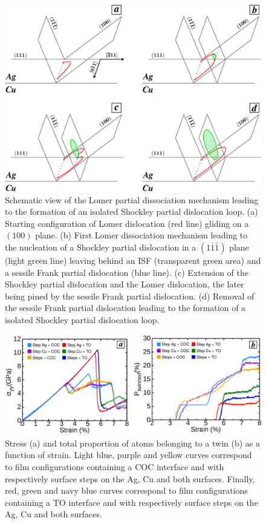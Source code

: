\documentclass[final,3p,times,twocolumn]{elsarticle}
\begin{document}
\begin{figure}[!t]
	\begin{center}
		\includegraphics[width=150mm]{Pic/fig_lomdisso.eps} 
	\end{center}
	\caption{Schematic view of the Lomer partial dissociation mechanism leading to the formation of an isolated Shockley partial dislocation loop. (a) Starting configuration of Lomer dislocation (red line) gliding on a $(100)$ plane. (b) First Lomer dissociation mechanism leading to the nucleation of a Shockley partial dislocation in a $(1\bar{1}\bar{1})$ plane (light green line) leaving behind an ISF (transparent green area) and a sessile Frank partial dislocation (blue line). (c) Extension of the Shockley partial dislocation and the Lomer dislocation, the later being pined by the sessile Frank partial dislocation. (d) Removal of the sessile Frank partial dislocation leading to the formation of a isolated Shockley partial dislocation loop.}\label{fig_Lomer}
\end{figure}
\begin{figure}[!b]
	\begin{center}
		\includegraphics[width=150mm]{Pic/graph_natstss.eps} 
	\end{center}
	\caption{Stress (a) and total proportion of atoms belonging to a twin (b) as a function of strain. Light blue, purple and yellow curves correspond to film configurations containing a COC interface and with respectively surface steps on the Ag, Cu and both surfaces. Finally, red, green and navy blue curves correspond to film configurations containing a TO interface and with respectively surface steps on the Ag, Cu and both surfaces.}\label{graph_stssnat}
\end{figure}
\end{document}
